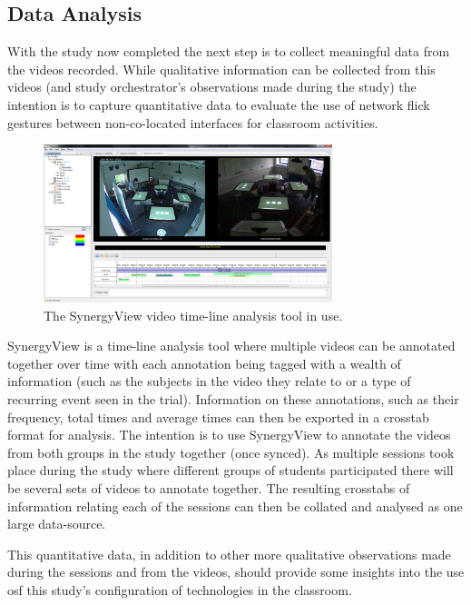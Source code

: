 \documentclass[a4paper,11pt]{article}
\begin{document}
\subsection{Data Analysis}

With the study now completed the next step is to collect meaningful data from the videos recorded.
While qualitative information can be collected from this videos (and study orchestrator’s observations made during the study) the intention is to capture quantitative data to evaluate the use of network flick gestures between non-co-located interfaces for classroom activities.

\begin{figure}[h]
 \centering
   \includegraphics[width=0.75\textwidth]{figures/synergyviewexample.png}
   \caption{The SynergyView video time-line analysis tool in use.}
   \label{fig:SynergyviewExample}
\end{figure}

SynergyView is a time-line analysis tool where multiple videos can be annotated together over time with each annotation being tagged with a wealth of information (such as the subjects in the video they relate to or a type of recurring event seen in the trial). %
Information on these annotations, such as their frequency, total times and average times can then be exported in a crosstab format for analysis.
The intention is to use SynergyView to annotate the videos from both groups in the study together (once synced).
As multiple sessions took place during the study where different groups of students participated there will be several sets of videos to annotate together.
The resulting crosstabs of information relating each of the sessions can then be collated and analysed as one large data-source.

This quantitative data, in addition to other more qualitative observations made during the sessions and from the videos, should provide some insights into the use osf this study’s configuration of technologies in the classroom.
\end{document}
